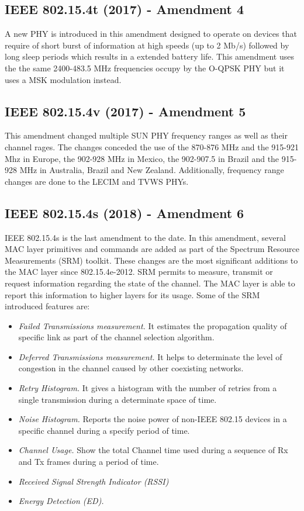 \documentclass[conference]{IEEEtran}
\begin{document}
\subsection{IEEE 802.15.4t (2017) - Amendment 4 }\label{wpan2017t}
A new PHY is introduced in this amendment \cite{std2017t} designed to operate on devices that require of short burst of information at high speeds (up to 2 Mb/s) followed by long sleep periods which results in a extended battery life. This amendment uses the the same 2400-483.5 MHz frequencies occupy by the O-QPSK PHY but it uses a MSK modulation instead.
\subsection{IEEE 802.15.4v (2017) - Amendment 5 }\label{wpan2017v}
This amendment \cite{std2017v} changed multiple SUN PHY frequency ranges as well as their channel rages. The changes conceded the use of the 870-876 MHz and the 915-921 Mhz in Europe, the 902-928 MHz in Mexico, the 902-907.5 in Brazil and the 915-928 MHz in Australia, Brazil and New Zealand. Additionally, frequency range changes are done to the LECIM and TVWS PHYs.
\subsection{IEEE 802.15.4s (2018) - Amendment 6 }\label{wpan2018s}
IEEE 802.15.4s \cite{std2018s} is the last amendment to the date. In this amendment, several MAC layer primitives and commands are added as part of the Spectrum Resource Measurements (SRM) toolkit. These changes are the most significant additions to the MAC layer since 802.15.4e-2012. SRM permits to measure, transmit or request information regarding the state of the channel. The MAC layer is able to report this information to higher layers for its usage. Some of the SRM introduced features are:





\begin{itemize}
  \setlength{\itemsep}{1pt}
  \setlength{\parskip}{0pt}
  \setlength{\parsep}{0pt}
  \item \textit{Failed Transmissions measurement.} It estimates the propagation quality of specific link as part of the channel selection algorithm.
  \item \textit{Deferred Transmissions measurement.} It helps to determinate the level of congestion in the channel caused by other coexisting networks.
  \item \textit{Retry Histogram.} It gives a histogram with the number of retries from a single transmission during a determinate space of time.
  \item \textit{Noise Histogram.} Reports the noise power of non-IEEE 802.15 devices in a specific channel during a specify period of time.  
  \item \textit{Channel Usage.} Show the total Channel time used during a sequence of Rx and Tx frames during a period of time.
  \item \textit{Received Signal Strength Indicator (RSSI)}
  \item \textit{Energy Detection (ED).}
\end{itemize}
\end{document}
